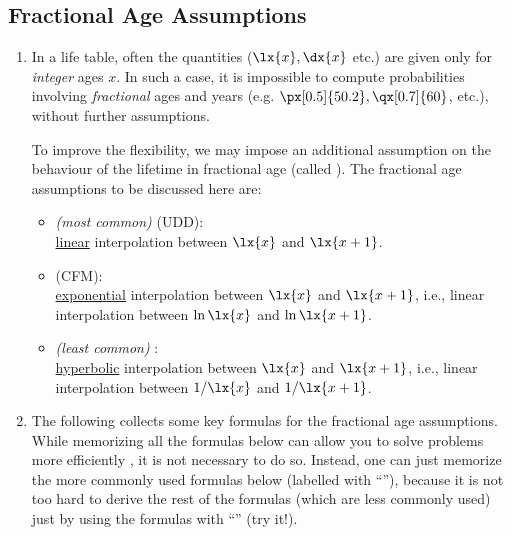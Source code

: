 \subsection{Fractional Age Assumptions}
\begin{enumerate}
\item In a life table, often the quantities (\(\lx{x},\dx{x}\) etc.) are given
only for \emph{integer} ages \(x\). In such a case, it is impossible to compute
probabilities involving \emph{fractional} ages and years (e.g.
\(\px[0.5]{50.2}, \qx[0.7]{60}\), etc.), without further assumptions.

To improve the flexibility, we may impose an additional assumption on the
behaviour of the lifetime in fractional age (called ). The fractional age assumptions to be discussed here are:
\begin{itemize}
\item \emph{(most common)}  (UDD): \\
\underline{linear} interpolation between \(\lx{x}\) and \(\lx{x+1}\).
\item {} (CFM): \\
\underline{exponential} interpolation between \(\lx{x}\) and \(\lx{x+1}\),
i.e.,  linear interpolation between \(\ln\lx{x}\) and \(\ln\lx{x+1}\).
\item \emph{(least common)} : \\
\underline{hyperbolic} interpolation between \(\lx{x}\) and \(\lx{x+1}\), i.e.,
linear interpolation between \(1/\lx{x}\) and \(1/\lx{x+1}\).
\end{itemize}

\item \label{it:faa-fmlas} The following collects some key 
formulas for the fractional age assumptions. While memorizing 
all the formulas below can allow you to solve problems more efficiently
, it is not necessary to do so. Instead, one can
just memorize the more commonly used formulas below (labelled with
``\ystar{}''), because it is not too hard to derive the rest of the formulas
(which are less commonly used) just by using the formulas with ``\ystar{}''
(try it!).


\end{enumerate}
